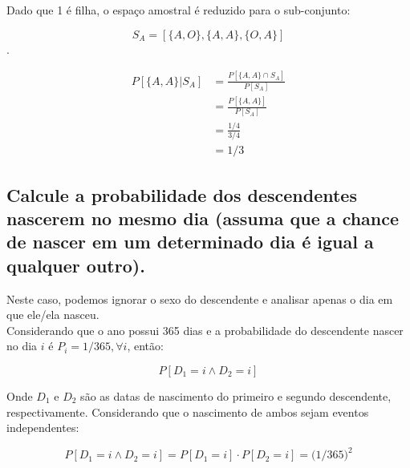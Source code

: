 \documentclass[a4paper]{article}
\begin{document}
Dado que 1 é filha, o espaço amostral é reduzido para o sub-conjunto: 

$$S_A = [\{A, O\}, \{A, A\}, \{O, A\}]$$.

\begin{equation}
    \begin{split}
        P[\{A, A\} | S_A] &= \frac{P[\{A, A\} \cap S_A]}{P[S_A]} \\
            &= \frac{P[\{A, A\}]}{P[S_A]} \\
            &= \frac{1/4}{3/4} \\
            &= 1/3
    \end{split}
\end{equation}

\subsection{Calcule a probabilidade dos descendentes nascerem no mesmo dia (assuma que a chance de nascer em um determinado dia é igual a qualquer outro).}

Neste caso, podemos ignorar o sexo do descendente e analisar apenas o dia em que ele/ela nasceu. \\

Considerando que o ano possui 365 dias e a probabilidade do descendente nascer no dia $i$ é $P_i = 1/365, \forall i$, então: 

$$P[D_1 = i \wedge D_2 = i]$$

Onde $D_1$ e $D_2$ são as datas de nascimento do primeiro e segundo descendente, respectivamente. Considerando que o nascimento de ambos sejam eventos independentes: 

$$P[D_1 = i \wedge D_2 = i] = P[D_1 = i] \cdot P[D_2 = i] = \Big( 1/365 \Big)^2$$





%
\end{document}
